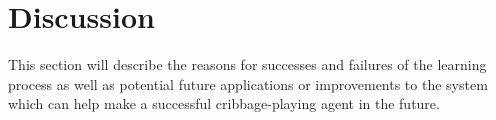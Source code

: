 \section{Discussion}
\label{sec:disc}



This section will describe the reasons for successes and failures of the learning
process as well as potential future applications or improvements to the
system which can help make a successful cribbage-playing agent in the future.









